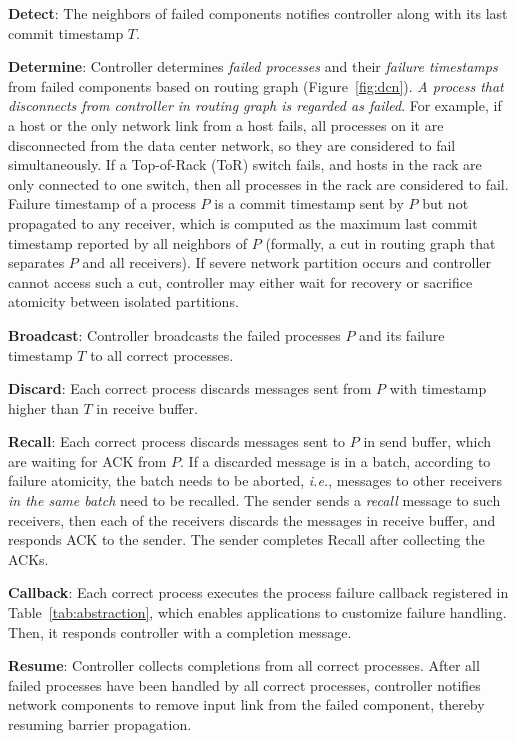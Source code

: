 \begin{ecompact}
\item \textbf{Detect}: The neighbors of failed components notifies controller along with its last commit timestamp $T$.
\item \textbf{Determine}: Controller determines \emph{failed processes} and their \emph{failure timestamps} from failed components based on routing graph (Figure~\ref{fig:dcn}). \emph{A process that disconnects from controller in routing graph is regarded as failed}.
For example, if a host or the only network link from a host fails, all processes on it are disconnected from the data center network, so they are considered to fail simultaneously.
If a Top-of-Rack (ToR) switch fails, and hosts in the rack are only connected to one switch, then all processes in the rack are considered to fail.
Failure timestamp of a process $P$ is a commit timestamp sent by $P$ but not propagated to any receiver, which is computed as the maximum last commit timestamp reported by all neighbors of $P$ (formally, a cut in routing graph that separates $P$ and all receivers).
If severe network partition occurs and controller cannot access such a cut, controller may either wait for recovery or sacrifice atomicity between isolated partitions.
\item \textbf{Broadcast}: Controller broadcasts the failed processes $P$ and its failure timestamp $T$ to all correct processes.
\item \textbf{Discard}: Each correct process discards messages sent from $P$ with timestamp higher than $T$ in receive buffer.
\item \textbf{Recall}: Each correct process discards messages sent to $P$ in send buffer, which are waiting for ACK from $P$. If a discarded message is in a batch, according to failure atomicity, the batch needs to be aborted, \emph{i.e.}, messages to other receivers \emph{in the same batch} need to be recalled. The sender sends a \emph{recall} message to such receivers, then each of the receivers discards the messages in receive buffer, and responds ACK to the sender. The sender completes Recall after collecting the ACKs.
\item \textbf{Callback}: Each correct process executes the process failure callback registered in Table~\ref{tab:abstraction}, which enables applications to customize failure handling. Then, it responds controller with a completion message.
\item \textbf{Resume}: Controller collects completions from all correct processes.
After all failed processes have been handled by all correct processes, controller notifies network components to remove input link from the failed component, thereby resuming barrier propagation.
\end{ecompact}

